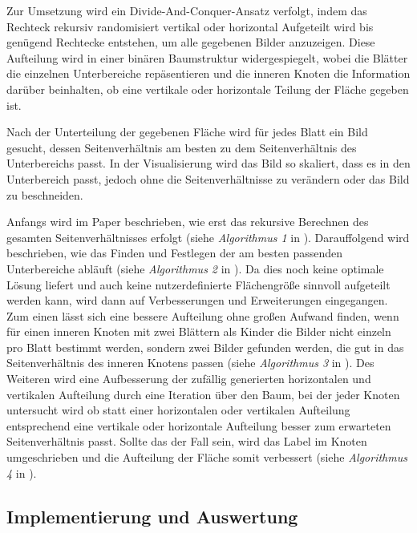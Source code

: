 \documentclass[12pt, ngerman, utf8]{article}
\begin{document}
Zur Umsetzung wird ein Divide-And-Conquer-Ansatz verfolgt, indem das Rechteck rekursiv randomisiert vertikal oder horizontal Aufgeteilt wird bis genügend Rechtecke entstehen, um alle gegebenen Bilder anzuzeigen. Diese Aufteilung wird in einer binären Baumstruktur widergespiegelt, wobei die Blätter die einzelnen Unterbereiche repäsentieren und die inneren Knoten die Information darüber beinhalten, ob eine vertikale oder horizontale Teilung der Fläche gegeben ist.

Nach der Unterteilung der gegebenen Fläche wird für jedes Blatt ein Bild gesucht, dessen Seitenverhältnis am besten zu dem Seitenverhältnis des Unterbereichs passt. In der Visualisierung wird das Bild so skaliert, dass es in den Unterbereich passt, jedoch ohne die Seitenverhältnisse zu verändern oder das Bild zu beschneiden.

Anfangs wird im Paper beschrieben, wie erst das rekursive Berechnen des gesamten Seitenverhältnisses erfolgt (siehe \emph{Algorithmus 1} in \cite{picwall}). Darauffolgend wird beschrieben, wie das Finden und Festlegen der am besten passenden Unterbereiche abläuft (siehe \emph{Algorithmus 2} in \cite{picwall}). Da dies noch keine optimale Lösung liefert und auch keine nutzerdefinierte Flächengröße sinnvoll aufgeteilt werden kann, wird dann auf Verbesserungen und Erweiterungen eingegangen. Zum einen lässt sich eine bessere Aufteilung ohne großen Aufwand finden, wenn für einen inneren Knoten mit zwei Blättern als Kinder die Bilder nicht einzeln pro Blatt bestimmt werden, sondern zwei Bilder gefunden werden, die gut in das Seitenverhältnis des inneren Knotens passen (siehe \emph{Algorithmus 3} in \cite{picwall}). Des Weiteren wird eine Aufbesserung der zufällig generierten horizontalen und vertikalen Aufteilung durch eine Iteration über den Baum, bei der jeder Knoten untersucht wird ob statt einer horizontalen oder vertikalen Aufteilung entsprechend eine vertikale oder horizontale Aufteilung besser zum erwarteten Seitenverhältnis passt. Sollte das der Fall sein, wird das Label im Knoten umgeschrieben und die Aufteilung der Fläche somit verbessert (siehe \emph{Algorithmus 4} in \cite{picwall}).

\subsection{Implementierung und Auswertung}
\end{document}
